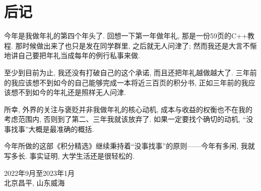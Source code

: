 \documentclass{ctexbook}
\begin{document}
{\chapter*{后记}
今年是我做年礼的第四个年头了. 回想一下第一年做年礼, 那是一份59页的C++教程. 那时候做出来了也只是发在同学群里, 之后就无人问津了; 然而我还是大言不惭地讲自己要把年礼当成每年的例行私事来做. \par
至少到目前为止, 我还没有打破自己的这个承诺, 而且还把年礼越做越大了. 三年前的我应该想不到如今的自己能够完成一本将近三百页的积分书, 正如三年前的我应该想不到如今的年礼还是照样无人问津. \par
所幸, 外界的关注与褒贬并非我做年礼的核心动机, 成本与收益的权衡也不在我的考虑范围内, 否则到了第二、三年我就该放弃了. 如果一定要找个确切的动机, “没事找事”大概是最准确的概括. \par
今年所做的这部《积分精选》继续秉持着“没事找事”的原则——今年有多闲, 我就写多长. 事实证明, 大学生活还是很轻松的. \par
\begin{flushright}
2022年9月至2023年1月\\
北京昌平, 山东威海
\end{flushright}

}
\end{document}
